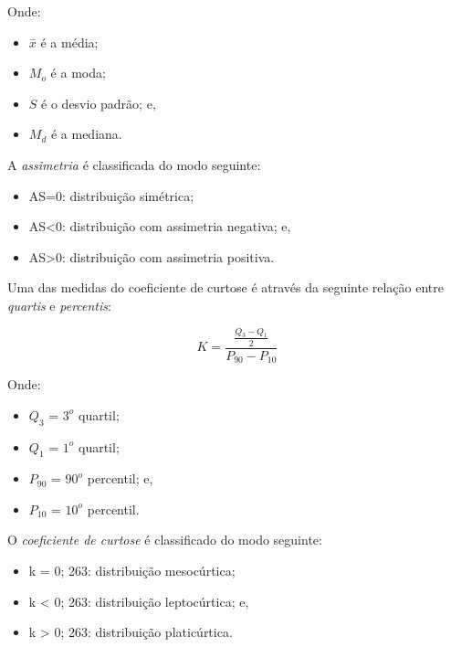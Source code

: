 \documentclass[
]{book}
\providecommand{\tightlist}{%
  \setlength{\itemsep}{0pt}\setlength{\parskip}{0pt}}
\begin{document}
\hfill\break

Onde:

\hfill\break

\begin{itemize}
\tightlist
\item
  \(\stackrel{-}{x}\) é a média;
\item
  \(M_{o}\) é a moda;
\item
  \(S\) é o desvio padrão; e,
\item
  \(M_{d}\) é a mediana.
\end{itemize}

\hfill\break

A \emph{assimetria} é classificada do modo seguinte:

\hfill\break

\begin{itemize}
\tightlist
\item
  AS=0: distribuição simétrica;
\item
  AS\textless0: distribuição com assimetria negativa; e,
\item
  AS\textgreater0: distribuição com assimetria positiva.
\end{itemize}

\hfill\break

Uma das medidas do coeficiente de curtose é através da seguinte relação entre \emph{quartis} e \emph{percentis}:

\hfill\break

\[
K = \frac{\frac{Q_{3} - Q_{1}}{2}   }   {P_{90} - P_{10}} 
\]

\hfill\break

Onde:

\hfill\break

\begin{itemize}
\tightlist
\item
  \(Q_{3}\) = \(3^{o}\) quartil;
\item
  \(Q_{1}\) = \(1^{o}\) quartil;
\item
  \(P_{90}\) = \(90^{o}\) percentil; e,
\item
  \(P_{10}\) = \(10^{o}\) percentil.
\end{itemize}

\hfill\break

O \emph{coeficiente de curtose} é classificado do modo seguinte:

\hfill\break

\begin{itemize}
\tightlist
\item
  k = 0; 263: distribuição mesocúrtica;
\item
  k \textless{} 0; 263: distribuição leptocúrtica; e,
\item
  k \textgreater{} 0; 263: distribuição platicúrtica.
\end{itemize}
\end{document}
